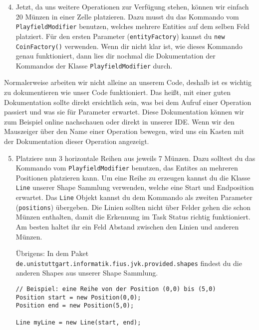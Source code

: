 \begin{enumerate} \setcounter{enumi}{3}
    \item Jetzt, da uns weitere Operationen zur Verfügung stehen, können wir einfach 20 Münzen in einer Zelle platzieren. 
        Dazu musst du das Kommando vom \lstinline{PlayfieldModifier} benutzen, welches mehrere Entities auf dem selben Feld platziert.
        Für den ersten Parameter (\lstinline{entityFactory}) kannst du \lstinline{new CoinFactory()} verwenden. 
        Wenn dir nicht klar ist, wie dieses Kommando genau funktioniert, dann lies dir nochmal die Dokumentation der Kommandos der Klasse \lstinline{PlayfieldModifier} durch.
\end{enumerate}

\begin{Infobox}
    Normalerweise arbeiten wir nicht alleine an unserem Code, deshalb ist es wichtig zu dokumentieren wie unser Code funktioniert. 
    Das heißt, mit einer guten Dokumentation sollte direkt ersichtlich sein, was bei dem Aufruf einer Operation passiert und was sie für Parameter erwartet. 
    Diese Dokumentation können wir zum Beispiel online nachschauen oder direkt in unserer IDE. 
    Wenn wir den Mauszeiger über den Name einer Operation bewegen, wird uns ein Kasten mit der Dokumentation dieser Operation angezeigt.
\end{Infobox}


\begin{enumerate} \setcounter{enumi}{4}
    \item Platziere nun 3 horizontale Reihen aus jeweils 7 Münzen. 
        Dazu solltest du das Kommando vom \lstinline{PlayfieldModifier} benutzen, das Entites an mehreren Positionen platzieren kann.
        Um eine Reihe zu erzeugen kannst du die Klasse \lstinline{Line} unserer Shape Sammlung verwenden, welche eine Start und Endposition erwartet.
        Das \lstinline{Line} Objekt kannst du dem Kommando als zweiten Parameter (\lstinline{positions}) übergeben.
        Die Linien sollten nicht über Felder gehen die schon Münzen enthalten, damit die Erkennung im Task Status richtig funktioniert.
        Am besten haltet ihr ein Feld Abstand zwischen den Linien und anderen Münzen.

        Übrigens: In dem Paket \texttt{de.unistuttgart.informatik.fius.jvk.provided.shapes} findest du die anderen Shapes aus unserer Shape Sammlung.

    \begin{lstlisting}
// Beispiel: eine Reihe von der Position (0,0) bis (5,0)
Position start = new Position(0,0);
Position end = new Position(5,0);

Line myLine = new Line(start, end);
    \end{lstlisting}

\end{enumerate}
